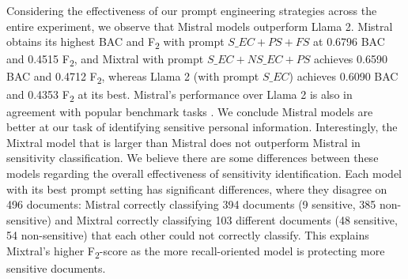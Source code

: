 Considering the effectiveness of our prompt engineering strategies across the entire experiment, we observe that Mistral models outperform Llama 2. Mistral obtains its highest BAC and F\textsubscript{2} with prompt $S\_EC+PS+FS$ at 0.6796 BAC and 0.4515 F\textsubscript{2}, and Mixtral with prompt $S\_EC+NS\_EC+PS$ achieves 0.6590 BAC and 0.4712 F\textsubscript{2}, whereas Llama 2 (with prompt $S\_EC$) achieves 0.6090 BAC and 0.4353 F\textsubscript{2} at its best. Mistral's performance over Llama 2 is also in agreement with popular benchmark tasks \cite{jiang2023mistral}. We conclude Mistral models are better at our task of identifying sensitive personal information. Interestingly, the Mixtral model that is larger than Mistral does not outperform Mistral in sensitivity classification. We believe there are some differences between these models regarding the overall effectiveness of sensitivity identification. Each model with its best prompt setting has significant differences, where they disagree on 496 documents: Mistral correctly classifying 394 documents (9 sensitive, 385 non-sensitive) and Mixtral correctly classifying 103 different documents (48 sensitive, 54 non-sensitive) that each other could not correctly classify. This explains Mixtral's higher F\textsubscript{2}-score as the more recall-oriented model is protecting more sensitive documents.

